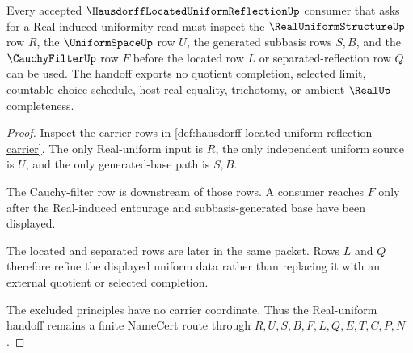 \begin{theorem}
\label{thm:hausdorff-located-uniform-reflection-real-uniform-handoff}
Every accepted $\HausdorffLocatedUniformReflectionUp$ consumer that asks for a Real-induced uniformity read must inspect the $\RealUniformStructureUp$ row $R$, the $\UniformSpaceUp$ row $U$, the generated subbasis rows $S,B$, and the $\CauchyFilterUp$ row $F$ before the located row $L$ or separated-reflection row $Q$ can be used. The handoff exports no quotient completion, selected limit, countable-choice schedule, host real equality, trichotomy, or ambient $\RealUp$ completeness.
\end{theorem}
\begin{proof}
Inspect the carrier rows in \autoref{def:hausdorff-located-uniform-reflection-carrier}. The only Real-uniform input is $R$, the only independent uniform source is $U$, and the only generated-base path is $S,B$.

The Cauchy-filter row is downstream of those rows. A consumer reaches $F$ only after the Real-induced entourage and subbasis-generated base have been displayed.

The located and separated rows are later in the same packet. Rows $L$ and $Q$ therefore refine the displayed uniform data rather than replacing it with an external quotient or selected completion.

The excluded principles have no carrier coordinate. Thus the Real-uniform handoff remains a finite NameCert route through $R,U,S,B,F,L,Q,E,T,C,P,N$.
\end{proof}




